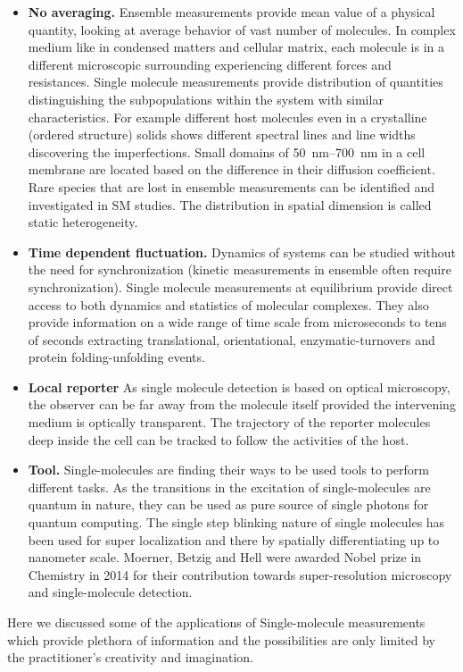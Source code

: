 \documentclass[11pt,a4paper,onecolumn]{article}
\begin{document}
\begin{itemize}
	\item \textbf{No averaging.} Ensemble measurements provide mean value of a physical quantity, looking at average behavior of vast number of molecules.
	In complex medium like in condensed matters and cellular matrix, each molecule is in a different microscopic surrounding experiencing different forces and resistances.
	Single molecule measurements provide distribution of quantities distinguishing the subpopulations within the system with similar characteristics.
	For example different host molecules even in a crystalline (ordered structure) solids shows different spectral lines and line widths discovering the imperfections.\cite{kozankiewicz1994single,reilly1993spectral}
	Small domains of \SIrange{50}{700}{\nm} in a cell membrane are located based on the difference in their diffusion coefficient.\cite{lommerse2004singlemolecule}
	Rare species that are lost in ensemble measurements can be identified and investigated in SM studies.
	The distribution in spatial dimension is called static heterogeneity.
	\item \textbf{Time dependent fluctuation.} Dynamics of systems can be studied without the need for synchronization (kinetic measurements in ensemble often require synchronization).
	Single molecule measurements at equilibrium provide direct access to both dynamics and statistics of molecular complexes.
	They also provide information on a wide range of time scale from microseconds to tens of seconds extracting translational, orientational, enzymatic-turnovers and protein folding-unfolding events.
	\item \textbf{Local reporter} As single molecule detection is based on optical microscopy, the observer can be far away from the molecule itself provided the intervening medium is optically transparent.
	The trajectory of the reporter molecules deep inside the cell can be tracked to follow the activities of the host.
	\item \textbf{Tool.} Single-molecules are finding their ways to be used tools to perform different tasks.
	As the transitions in the excitation of single-molecules are quantum in nature, they can be used as pure source of single photons for quantum computing.
	The single step blinking nature of single molecules has been used for super localization and there by spatially differentiating up to nanometer scale.
	Moerner, Betzig and Hell were awarded Nobel prize in Chemistry in 2014 for their contribution towards super-resolution microscopy and single-molecule detection.
\end{itemize}
Here we discussed some of the applications of Single-molecule measurements which provide plethora of information and the possibilities are only limited by the practitioner's creativity and imagination.
\end{document}
